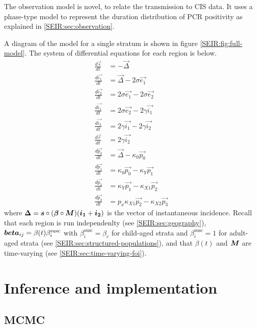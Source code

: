\documentclass[thesis.tex]{subfiles}
\begin{document}
The observation model is novel, to relate the transmission to CIS data.
It uses a phase-type model to represent the duration distribution of PCR positivity as explained in \cref{SEIR:sec:observation}.

A diagram of the model for a single stratum is shown in figure \cref{SEIR:fig:full-model}.
The system of differential equations for each region is below.
\begin{align}
    \label{SEIR:eq:fullODEs}
    \frac{d\vec{s}}{dt} &= -\vec{\Delta} \\
    \frac{d\vec{e_1}}{dt} &= \vec{\Delta} - 2\sigma \vec{e_1} \\
    \frac{d\vec{e_2}}{dt} &= 2\sigma \vec{e_1} - 2\sigma \vec{e_2} \\
    \frac{d\vec{i_1}}{dt} &= 2\sigma \vec{e_2} - 2\gamma \vec{i_1} \\
    \frac{d\vec{i_2}}{dt} &= 2\gamma \vec{i_1} - 2\gamma \vec{i_2} \\
    \frac{d\vec{r}}{dt} &= 2\gamma \vec{i_2} \\
    \frac{d\vec{p_0}}{dt} &= \vec{\Delta} - \kappa_0 \vec{p_0} \\
    \frac{d\vec{p_1}}{dt} &= \kappa_0 \vec{p_0} - \kappa_Y \vec{p_1} \\
    \frac{d\vec{p_2}}{dt} &= \kappa_Y \vec{p_1} - \kappa_{X1} \vec{p_2} \\
    \frac{d\vec{p_3}}{dt} &= p_x \kappa_{X1} \vec{p_2} - \kappa_{X2} \vec{p_3}
\end{align}
where $\bm{\Delta} = \bm{s} \circ (\bm{\beta} \circ \bm{M}) (\bm{i_1} + \bm{i_2})$ is the vector of instantaneous incidence.
Recall that each region is run independenlty (see \cref{SEIR:sec:geography}), $\bm{beta}_{ij} = \beta(t) \beta^\text{susc}_i$ with $\beta^\text{susc}_i = \beta_c$ for child-aged strata and $\beta^\text{susc}_i = 1$ for adult-aged strata (see \cref{SEIR:sec:structured-populations}), and that $\beta(t)$ and $\bm{M}$ are time-varying (see \cref{SEIR:sec:time-varying-foi}).

\section{Inference and implementation} \label{SEIR:sec:inference-implementation}

\subsection{MCMC} \label{SEIR:sec:MCMC}
\end{document}
